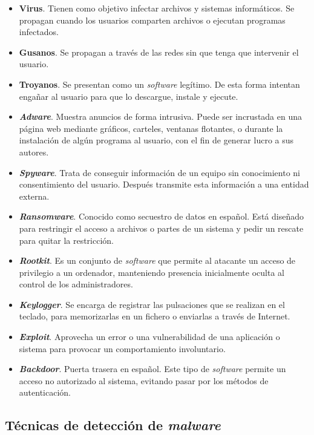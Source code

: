 \begin{itemize}
	\item \textbf{Virus}. Tienen como objetivo infectar archivos y sistemas informáticos. Se propagan cuando los usuarios comparten archivos o ejecutan programas infectados.
	\item \textbf{Gusanos}. Se propagan a través de las redes sin que tenga que intervenir el usuario.
	\item \textbf{Troyanos}. Se presentan como un \textit{software} legítimo. De esta forma intentan engañar al usuario para que lo descargue, instale y ejecute.
	\item \textbf{\textit{Adware}}. Muestra anuncios de forma intrusiva. Puede ser incrustada en una página web mediante gráficos, carteles, ventanas flotantes, o durante la instalación de algún programa al usuario, con el fin de generar lucro a sus autores.
	\item \textbf{\textit{Spyware}}. Trata de conseguir información de un equipo sin conocimiento ni consentimiento del usuario. Después transmite esta información a una entidad externa.
	\item \textbf{\textit{Ransomware}}. Conocido como secuestro de datos en español. Está diseñado para restringir el acceso a archivos o partes de un sistema y pedir un rescate para quitar la restricción.
	\item \textbf{\textit{Rootkit}}. Es un conjunto de \textit{software} que permite al atacante un acceso de privilegio a un ordenador, manteniendo presencia inicialmente oculta al control de los administradores.
	\item \textbf{\textit{Keylogger}}. Se encarga de registrar las pulsaciones que se realizan en el teclado, para memorizarlas en un fichero o enviarlas a través de Internet.
	\item \textbf{\textit{Exploit}}. Aprovecha un error o una vulnerabilidad de una aplicación o sistema para provocar un comportamiento involuntario.
	\item \textbf{\textit{Backdoor}}. Puerta trasera en español. Este tipo de \textit{software} permite un acceso no autorizado al sistema, evitando pasar por los métodos de autenticación.
\end{itemize}

\subsection{Técnicas de detección de \textit{malware}}
\label{subsec:deteccion_malware}

